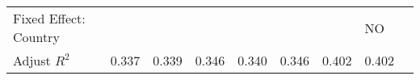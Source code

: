 \documentclass[12pt]{article}
\begin{document}
\begin{sidewaystable}[h]
{\begin{tabular}{lllllllll}
Fixed Effect: Country                             &                                                                   &                                                                   &                                                                   &                                                                   &                                                                   &                                                                                        & NO                                                                 &  \\
Adjust $R^2$                                      & 0.337                                                             & 0.339                                                             & 0.346                                                             & 0.340                                                             & 0.346                                                             & 0.402                                                                                  & 0.402                                                              &  \\ \hline
\end{tabular}}
\end{sidewaystable}
\end{document}
